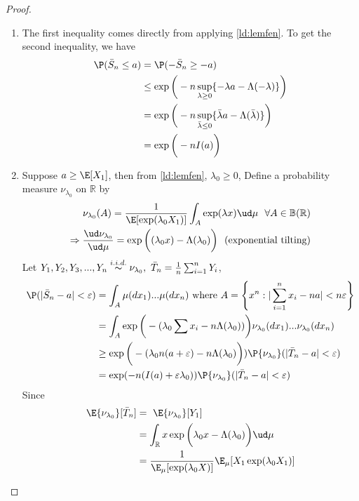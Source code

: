 \documentclass{article}
\begin{document}
\begin{proof}$\ $
	\begin{enumerate}[label=(\roman*)]
		\item The first inequality comes directly from applying \cref{ld:lemfen}. To get the second inequality, we have
		\begin{align*}
		    \P(\bar{S}_n\leq a)&= \P(-\bar{S}_n\geq -a)\\
		    &\le \exp\bigg(-n\sup_{\lambda\ge 0 } \{-\lambda a- \Lambda(-\lambda)\}\bigg)\\
		    &= \exp\bigg(-n\sup_{\bar{\lambda}\le 0 } \{\bar{\lambda} a- \Lambda(\bar{\lambda})\}\bigg)\\
		    &= \exp\bigg(-nI(a)\bigg)
		\end{align*}
		
		\item Suppose $a\geq\E[X_1]$, then from \cref{ld:lemfen}, $\lambda_0\geq0$,
			Define a probability measure $\nu_{\lambda_0}$ on $\mathbb{R}$ by
			\begin{align*}
			\nu_{\lambda_0}(A)=\frac{1}{\E[\exp(\lambda_0 X_1)]}\int_{A}\exp(\lambda x)\ud \mu\ \ \forall A \in\mathbb{B}(\mathbb{R})\\
			\Rightarrow \frac{\ud\nu_{\lambda_0}}{\ud\mu}=\exp\bigg((\lambda_0 x)-\Lambda(\lambda_0)\bigg)\ \ \mbox{(exponential tilting)}
			\end{align*}
			Let $Y_1,Y_2,Y_3,...,Y_n\overset{i.i.d.}{\thicksim}\nu_{\lambda_0},\ \bar{T}_n=\frac{1}{n}\sum_{i=1}^{n}Y_i$,
			\begin{align*}
			\P(|\bar{S}_n-a|<\varepsilon)
			&=\int_{A}\mu(d x_1)...\mu(d x_n)\ \mbox{where}\ A=\left\{x^n:|\sum_{i=1}^{n}x_i-na|<n\varepsilon\right\}\\
			&=\int_{A}\exp\bigg(-(\lambda_0\sum x_i-n\Lambda(\lambda_0))\bigg)\nu_{\lambda_0}(d x_1)...\nu_{\lambda_0}(d x_n)\\
			&\geq\exp\bigg(-(\lambda_0 n(a+\varepsilon)-n\Lambda(\lambda_0)\bigg))\P{\nu_{\lambda_0}}(|\bar{T}_n-a|<\varepsilon)\\
			&=\exp(-n(I(a)+\varepsilon\lambda_0))\P{\nu_{\lambda_0}}(|\bar{T}_n-a|<\varepsilon) 
			\end{align*}
			Since
			\begin{align*}
			\E{\nu_{\lambda_0}}[\bar{T}_n] &= \ \E{\nu_{\lambda_0}}[Y_1]\\
			&=\int_{\mathbb{R}}x\exp\bigg(\lambda_0 x-\Lambda(\lambda_0)\bigg)\ud\mu\\
			&=\frac{1}{\E_\mu[\exp(\lambda_0 X)]}\E_\mu[X_1\exp(\lambda_0 X_1)]\\

\end{align*}
\end{enumerate}
\end{proof}
\end{document}
